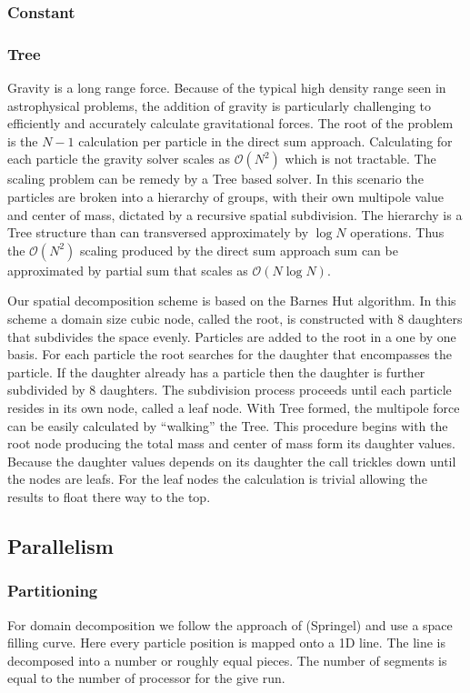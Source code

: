 \subsubsection{Constant}
\subsubsection{Tree}
Gravity is a long range force. Because of the typical high density range
seen in astrophysical problems, the addition of gravity is particularly challenging to
efficiently and accurately calculate gravitational forces. The root of the problem
is the $N-1$ calculation per particle in the direct sum approach. Calculating for
each particle the gravity solver scales as $\mathcal{O}(N^2)$ which is not tractable.
The scaling problem can be remedy by a Tree based solver. In this scenario the particles
are broken into a hierarchy of groups, with their own multipole value and center of mass, dictated by a 
recursive spatial subdivision. The hierarchy is a Tree structure than can transversed approximately
by $\log{}N$ operations. Thus the $\mathcal{O}(N^2)$ scaling produced by the direct sum
approach sum can be approximated by partial sum that scales as $\mathcal{O}(N\log{}N)$.

Our spatial decomposition scheme is based on the Barnes Hut algorithm. In this scheme
a domain size cubic node, called the root, is constructed with 8 daughters that
subdivides the space evenly. Particles are added to the root in a one by one basis. For each particle
the root searches for the daughter that encompasses the particle. If the daughter already
has a particle then the daughter is further subdivided by 8 daughters. The subdivision process
proceeds until each particle resides in its own node, called a leaf node. With Tree formed, the
multipole force can be easily calculated by ``walking'' the Tree. This procedure begins
with the root node producing the total mass and center of mass form its daughter values.
Because the daughter values depends on its daughter the call trickles down until the nodes
are leafs. For the leaf nodes the calculation is trivial allowing the results to float
there way to the top.


\subsection{Parallelism}
\label{sec.parallel}
\subsubsection{Partitioning}
For domain decomposition we follow the approach of (Springel) and use
a space filling curve. Here every particle position is mapped onto a
1D line. The line is decomposed into a number or roughly equal pieces.
The number of segments is equal to the number of processor for the
give run.

